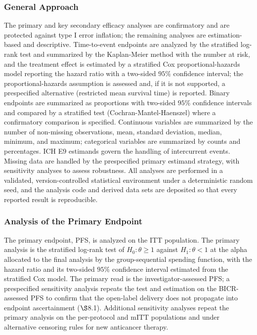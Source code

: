 \subsubsection{General Approach}

The primary and key secondary efficacy analyses are confirmatory and are protected
against type I error inflation; the remaining analyses are estimation-based and
descriptive. Time-to-event endpoints are analyzed by the stratified log-rank test and
summarized by the Kaplan-Meier method with the number at risk, and the treatment
effect is estimated by a stratified Cox proportional-hazards model reporting the
hazard ratio with a two-sided $95\%$ confidence interval; the proportional-hazards
assumption is assessed and, if it is not supported, a prespecified alternative
(restricted mean survival time) is reported. Binary endpoints are summarized as
proportions with two-sided $95\%$ confidence intervals and compared by a
stratified test (Cochran-Mantel-Haenszel) where a confirmatory comparison is
specified. Continuous variables are summarized by the number of non-missing
observations, mean, standard deviation, median, minimum, and maximum; categorical
variables are summarized by counts and percentages. ICH E9 estimands govern the
handling of intercurrent events. Missing data are handled by the prespecified primary
estimand strategy, with sensitivity analyses to assess robustness. All analyses are
performed in a validated, version-controlled statistical environment under a
deterministic random seed, and the analysis code and derived data sets are deposited
so that every reported result is reproducible.

\clearpage

\subsubsection{Analysis of the Primary Endpoint}

The primary endpoint, PFS, is analyzed on the ITT population. The primary analysis is
the stratified log-rank test of $H_0\!: \theta \geq 1$ against $H_1\!: \theta < 1$ at
the alpha allocated to the final analysis by the group-sequential spending function,
with the hazard ratio and its two-sided $95\%$ confidence interval estimated from the
stratified Cox model. The primary read is the investigator-assessed PFS; a
prespecified sensitivity analysis repeats the test and estimation on the
BICR-assessed PFS to confirm that the open-label delivery does not propagate into
endpoint ascertainment ($\S$8.1). Additional sensitivity analyses repeat the primary
analysis on the per-protocol and mITT populations and under alternative
censoring rules for new anticancer therapy.

